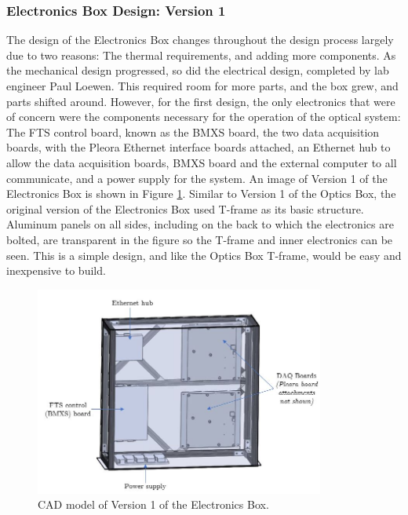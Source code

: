 \subsubsection{Electronics Box Design: Version 1}
The design of the Electronics Box changes throughout the design process largely due to two reasons: The thermal requirements, and adding more components. As the mechanical design progressed, so did the electrical design, completed by lab engineer Paul Loewen. This required room for more parts, and the box grew, and parts shifted around. However, for the first design, the only electronics that were of concern were the components necessary for the operation of the optical system: The FTS control board, known as the BMXS board, the two data acquisition boards, with the Pleora Ethernet interface boards attached, an Ethernet hub to allow the data acquisition boards, BMXS board and the external computer to all communicate, and a power supply for the system. An image of Version 1 of the Electronics Box is shown in Figure \ref{fig:Ebox_V1}. Similar to Version 1 of the Optics Box, the original version of the Electronics Box used T-frame as its basic structure. Aluminum panels on all sides, including on the back to which the electronics are bolted, are transparent in the figure so the T-frame and inner electronics can be seen. This is a simple design, and like the Optics Box T-frame, would be easy and inexpensive to build.

\begin{figure}
    \centering
    \includegraphics[width=0.85\textwidth]{chap3_images/LIFE_V1_images/Ebox_V1_labelled.JPG}
    \caption{CAD model of Version 1 of the Electronics Box.}
    \label{fig:Ebox_V1}
\end{figure}


